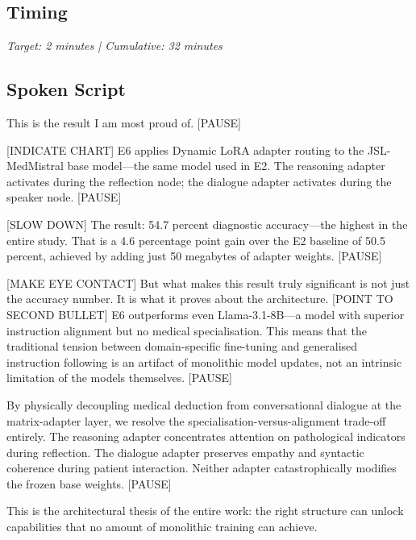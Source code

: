 \documentclass[12pt]{article}
\begin{document}
  \subsection*{Timing}
  \textit{Target: 2 minutes | Cumulative: 32 minutes}

  \subsection*{Spoken Script}
  \begin{spokenbox}
   This is the result I am most proud of. [PAUSE]

  [INDICATE CHART] E6 applies Dynamic LoRA adapter routing to the JSL-MedMistral base model---the same model used in E2. The reasoning adapter activates during the reflection node; the dialogue adapter activates during the speaker node. [PAUSE]

  [SLOW DOWN] The result: 54.7 percent diagnostic accuracy---the highest in the entire study. That is a 4.6 percentage point gain over the E2 baseline of 50.5 percent, achieved by adding just 50 megabytes of adapter weights. [PAUSE]

  [MAKE EYE CONTACT] But what makes this result truly significant is not just the accuracy number. It is what it proves about the architecture. [POINT TO SECOND BULLET] E6 outperforms even Llama-3.1-8B---a model with superior instruction alignment but no medical specialisation. This means that the traditional tension between domain-specific fine-tuning and generalised instruction following is an artifact of monolithic model updates, not an intrinsic limitation of the models themselves. [PAUSE]

  By physically decoupling medical deduction from conversational dialogue at the matrix-adapter layer, we resolve the specialisation-versus-alignment trade-off entirely. The reasoning adapter concentrates attention on pathological indicators during reflection. The dialogue adapter preserves empathy and syntactic coherence during patient interaction. Neither adapter catastrophically modifies the frozen base weights. [PAUSE]

  This is the architectural thesis of the entire work: the right structure can unlock capabilities that no amount of monolithic training can achieve.
  \end{spokenbox}
\end{document}
